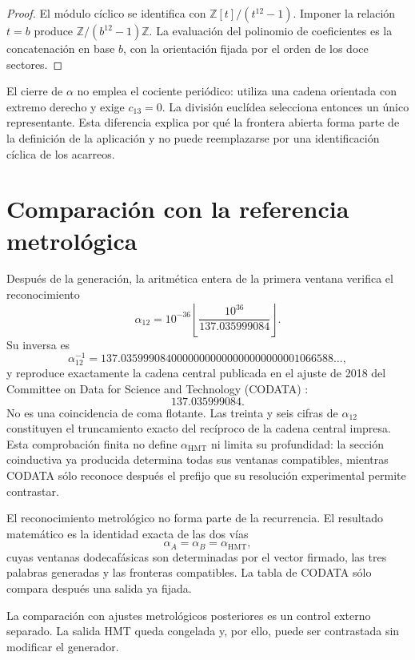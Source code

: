\begin{proof}
El módulo cíclico se identifica con
\(\mathbb Z[t]/(t^{12}-1)\). Imponer la relación \(t=b\) produce
\(\mathbb Z/(b^{12}-1)\mathbb Z\). La evaluación del polinomio de
coeficientes es la concatenación en base \(b\), con la orientación fijada
por el orden de los doce sectores.
\end{proof}

El cierre de \(\alpha\) no emplea el cociente periódico: utiliza una cadena
orientada con extremo derecho y exige \(c_{13}=0\). La división euclídea
selecciona entonces un único representante. Esta diferencia explica por
qué la frontera abierta forma parte de la definición de la aplicación y no
puede reemplazarse por una identificación cíclica de los acarreos.

\section{Comparación con la referencia metrológica}

Después de la generación, la aritmética entera de la primera ventana
verifica el reconocimiento
\[
\boxed{
\alpha_{12}
=10^{-36}
\left\lfloor\frac{10^{36}}{137.035999084}\right\rfloor.}
\]
Su inversa es
\[
\alpha_{12}^{-1}
=137.03599908400000000000000000000001066588\ldots,
\]
y reproduce exactamente la cadena central publicada en el ajuste de 2018 del
Committee on Data for Science and Technology (CODATA) \cite{Tiesinga2021CODATA}:
\[
\boxed{137.035999084.}
\]
No es una coincidencia de coma flotante. Las treinta y seis cifras de
\(\alpha_{12}\) constituyen el truncamiento exacto del recíproco de la
cadena central impresa. Esta comprobación finita no define
\(\alpha_{\mathrm{HMT}}\) ni limita su profundidad: la sección coinductiva
ya producida determina todas sus ventanas compatibles, mientras CODATA sólo
reconoce después el prefijo que su resolución experimental permite
contrastar.

El reconocimiento metrológico no forma parte de la recurrencia. El resultado
matemático es la identidad exacta de las dos vías
\[
 \alpha_A=\alpha_B=\alpha_{\mathrm{HMT}},
\]
cuyas ventanas dodecafásicas son determinadas por el vector firmado, las
tres palabras generadas y las fronteras compatibles. La tabla de CODATA
sólo compara después una salida ya fijada.

La comparación con ajustes metrológicos posteriores es un control externo
separado. La salida HMT queda congelada y, por ello, puede ser contrastada sin
modificar el generador.

